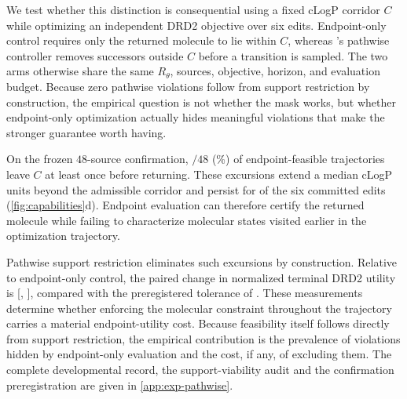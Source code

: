 We test whether this distinction is consequential using a fixed cLogP corridor $C$ while optimizing an independent DRD2 objective over six edits. Endpoint-only control requires only the returned molecule to lie within $C$, whereas \method{}'s pathwise controller removes successors outside $C$ before a transition is sampled. The two arms otherwise share the same $R_\theta$, sources, objective, horizon, and evaluation budget. Because zero pathwise violations follow from support restriction by construction, the empirical question is not whether the mask works, but whether endpoint-only optimization actually hides meaningful violations that make the stronger guarantee worth having.

On the frozen $48$-source confirmation, \XXX{}$/48$ (\XXX{}\%) of endpoint-feasible trajectories leave $C$ at least once before returning. These excursions extend a median \XXX{} cLogP units beyond the admissible corridor and persist for \XXX{} of the six committed edits (\cref{fig:capabilities}d). Endpoint evaluation can therefore certify the returned molecule while failing to characterize molecular states visited earlier in the optimization trajectory.

Pathwise support restriction eliminates such excursions by construction. Relative to endpoint-only control, the paired change in normalized terminal DRD2 utility is \XXX{} [\XXX{}, \XXX{}], compared with the preregistered tolerance of \XXX{}. These measurements determine whether enforcing the molecular constraint throughout the trajectory carries a material endpoint-utility cost. Because feasibility itself follows directly from support restriction, the empirical contribution is the prevalence of violations hidden by endpoint-only evaluation and the cost, if any, of excluding them. The complete developmental record, the support-viability audit and the confirmation preregistration are given in \cref{app:exp-pathwise}.

